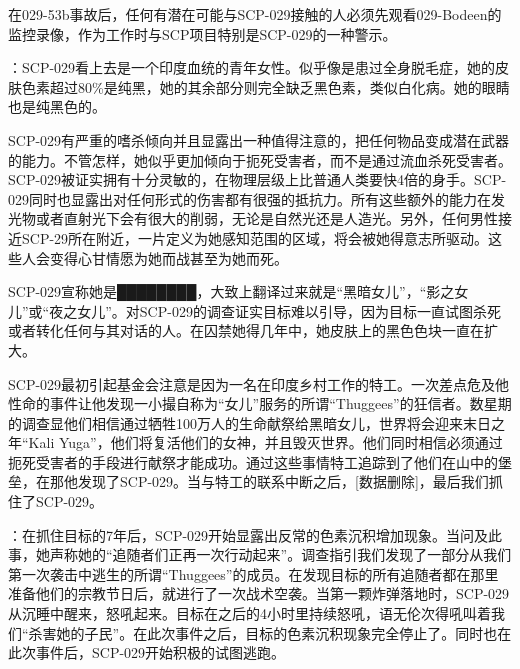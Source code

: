 在029-53b事故后，任何有潜在可能与SCP-029接触的人必须先观看029-Bodeen的监控录像，作为工作时与SCP项目特别是SCP-029的一种警示。

：SCP-029看上去是一个印度血统的青年女性。似乎像是患过全身脱毛症，她的皮肤色素超过80\%是纯黑，她的其余部分则完全缺乏黑色素，类似白化病。她的眼睛也是纯黑色的。

SCP-029有严重的嗜杀倾向并且显露出一种值得注意的，把任何物品变成潜在武器的能力。不管怎样，她似乎更加倾向于扼死受害者，而不是通过流血杀死受害者。SCP-029被证实拥有十分灵敏的，在物理层级上比普通人类要快4倍的身手。SCP-029同时也显露出对任何形式的伤害都有很强的抵抗力。所有这些额外的能力在发光物或者直射光下会有很大的削弱，无论是自然光还是人造光。另外，任何男性接近SCP-29所在附近，一片定义为她感知范围的区域，将会被她得意志所驱动。这些人会变得心甘情愿为她而战甚至为她而死。

SCP-029宣称她是████████，大致上翻译过来就是“黑暗女儿”，“影之女儿”或“夜之女儿”。对SCP-029的调查证实目标难以引导，因为目标一直试图杀死或者转化任何与其对话的人。在囚禁她得几年中，她皮肤上的黑色色块一直在扩大。

SCP-029最初引起基金会注意是因为一名在印度乡村工作的特工。一次差点危及他性命的事件让他发现一小撮自称为“女儿”服务的所谓“Thuggees”的狂信者。数星期的调查显他们相信通过牺牲100万人的生命献祭给黑暗女儿，世界将会迎来末日之年“Kali Yuga”，他们将复活他们的女神，并且毁灭世界。他们同时相信必须通过扼死受害者的手段进行献祭才能成功。通过这些事情特工追踪到了他们在山中的堡垒，在那他发现了SCP-029。当与特工的联系中断之后，[数据删除]，最后我们抓住了SCP-029。

：在抓住目标的7年后，SCP-029开始显露出反常的色素沉积增加现象。当问及此事，她声称她的“追随者们正再一次行动起来”。调查指引我们发现了一部分从我们第一次袭击中逃生的所谓“Thuggees”的成员。在发现目标的所有追随者都在那里准备他们的宗教节日后，就进行了一次战术空袭。当第一颗炸弹落地时，SCP-029从沉睡中醒来，怒吼起来。目标在之后的4小时里持续怒吼，语无伦次得吼叫着我们“杀害她的子民”。在此次事件之后，目标的色素沉积现象完全停止了。同时也在此次事件后，SCP-029开始积极的试图逃跑。
